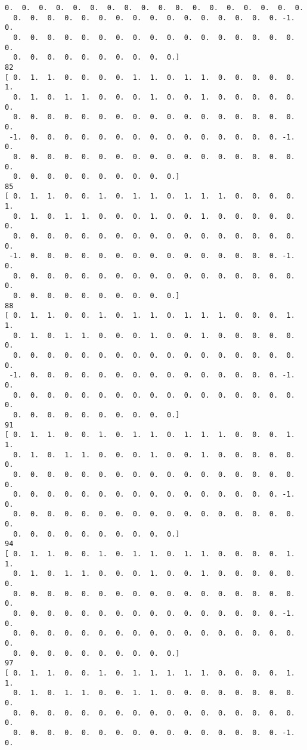 \documentclass[11pt]{article}
\begin{document}
\begin{Verbatim}[commandchars=\\\{\}]
  0.  0.  0.  0.  0.  0.  0.  0.  0.  0.  0.  0.  0.  0.  0.  0.  0.  0.
  0.  0.  0.  0.  0.  0.  0.  0.  0.  0.  0.  0.  0.  0.  0.  0. -1.  0.
  0.  0.  0.  0.  0.  0.  0.  0.  0.  0.  0.  0.  0.  0.  0.  0.  0.  0.
  0.  0.  0.  0.  0.  0.  0.  0.  0.  0.]
82
[ 0.  1.  1.  0.  0.  0.  0.  1.  1.  0.  1.  1.  0.  0.  0.  0.  0.  1.
  0.  1.  0.  1.  1.  0.  0.  0.  1.  0.  0.  1.  0.  0.  0.  0.  0.  0.
  0.  0.  0.  0.  0.  0.  0.  0.  0.  0.  0.  0.  0.  0.  0.  0.  0.  0.
 -1.  0.  0.  0.  0.  0.  0.  0.  0.  0.  0.  0.  0.  0.  0.  0. -1.  0.
  0.  0.  0.  0.  0.  0.  0.  0.  0.  0.  0.  0.  0.  0.  0.  0.  0.  0.
  0.  0.  0.  0.  0.  0.  0.  0.  0.  0.]
85
[ 0.  1.  1.  0.  0.  1.  0.  1.  1.  0.  1.  1.  1.  0.  0.  0.  0.  1.
  0.  1.  0.  1.  1.  0.  0.  0.  1.  0.  0.  1.  0.  0.  0.  0.  0.  0.
  0.  0.  0.  0.  0.  0.  0.  0.  0.  0.  0.  0.  0.  0.  0.  0.  0.  0.
 -1.  0.  0.  0.  0.  0.  0.  0.  0.  0.  0.  0.  0.  0.  0.  0. -1.  0.
  0.  0.  0.  0.  0.  0.  0.  0.  0.  0.  0.  0.  0.  0.  0.  0.  0.  0.
  0.  0.  0.  0.  0.  0.  0.  0.  0.  0.]
88
[ 0.  1.  1.  0.  0.  1.  0.  1.  1.  0.  1.  1.  1.  0.  0.  0.  1.  1.
  0.  1.  0.  1.  1.  0.  0.  0.  1.  0.  0.  1.  0.  0.  0.  0.  0.  0.
  0.  0.  0.  0.  0.  0.  0.  0.  0.  0.  0.  0.  0.  0.  0.  0.  0.  0.
 -1.  0.  0.  0.  0.  0.  0.  0.  0.  0.  0.  0.  0.  0.  0.  0. -1.  0.
  0.  0.  0.  0.  0.  0.  0.  0.  0.  0.  0.  0.  0.  0.  0.  0.  0.  0.
  0.  0.  0.  0.  0.  0.  0.  0.  0.  0.]
91
[ 0.  1.  1.  0.  0.  1.  0.  1.  1.  0.  1.  1.  1.  0.  0.  0.  1.  1.
  0.  1.  0.  1.  1.  0.  0.  0.  1.  0.  0.  1.  0.  0.  0.  0.  0.  0.
  0.  0.  0.  0.  0.  0.  0.  0.  0.  0.  0.  0.  0.  0.  0.  0.  0.  0.
  0.  0.  0.  0.  0.  0.  0.  0.  0.  0.  0.  0.  0.  0.  0.  0. -1.  0.
  0.  0.  0.  0.  0.  0.  0.  0.  0.  0.  0.  0.  0.  0.  0.  0.  0.  0.
  0.  0.  0.  0.  0.  0.  0.  0.  0.  0.]
94
[ 0.  1.  1.  0.  0.  1.  0.  1.  1.  0.  1.  1.  0.  0.  0.  0.  1.  1.
  0.  1.  0.  1.  1.  0.  0.  0.  1.  0.  0.  1.  0.  0.  0.  0.  0.  0.
  0.  0.  0.  0.  0.  0.  0.  0.  0.  0.  0.  0.  0.  0.  0.  0.  0.  0.
  0.  0.  0.  0.  0.  0.  0.  0.  0.  0.  0.  0.  0.  0.  0.  0. -1.  0.
  0.  0.  0.  0.  0.  0.  0.  0.  0.  0.  0.  0.  0.  0.  0.  0.  0.  0.
  0.  0.  0.  0.  0.  0.  0.  0.  0.  0.]
97
[ 0.  1.  1.  0.  0.  1.  0.  1.  1.  1.  1.  1.  0.  0.  0.  0.  1.  1.
  0.  1.  0.  1.  1.  0.  0.  1.  1.  0.  0.  0.  0.  0.  0.  0.  0.  0.
  0.  0.  0.  0.  0.  0.  0.  0.  0.  0.  0.  0.  0.  0.  0.  0.  0.  0.
  0.  0.  0.  0.  0.  0.  0.  0.  0.  0.  0.  0.  0.  0.  0.  0. -1.  0.

\end{Verbatim}
\end{document}
